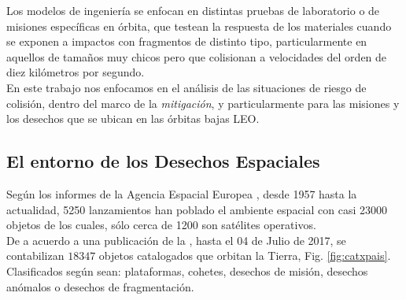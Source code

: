 Los modelos de ingenier\'ia se enfocan en distintas pruebas de laboratorio o de misiones espec\'ificas en \'orbita, que testean la respuesta de los materiales cuando se exponen a impactos con fragmentos de distinto tipo, particularmente en aquellos de tama\~nos muy chicos pero que colisionan a velocidades del orden de diez kil\'ometros por segundo.\\

En este trabajo nos enfocamos en el an\'alisis de las situaciones de riesgo de colisi\'on, dentro del marco de la {\it{mitigaci\'on}}, y particularmente para las misiones y los desechos que se ubican en las \'orbitas bajas \ac{LEO}.\\

\subsection*{El entorno de los Desechos Espaciales}
Seg\'un los informes de la Agencia Espacial Europea \citep{esaSD}, desde 1957 hasta la actualidad, 5250 lanzamientos han poblado el ambiente espacial con casi 23000 objetos de los cuales, s\'olo cerca de 1200 son sat\'elites operativos.\\

De a acuerdo a una publicaci\'on de la \cite{ODQNum}, hasta el 04 de Julio de 2017, se contabilizan $18347$ objetos catalogados que orbitan la Tierra, Fig. \ref{fig:catxpais}. Clasificados seg\'un sean: plataformas, cohetes, desechos de misi\'on, desechos an\'omalos o desechos de fragmentaci\'on.\\

